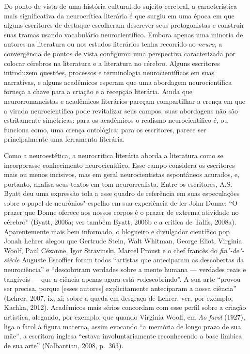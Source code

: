 Do ponto de vista de uma história cultural do sujeito cerebral, a
característica mais significativa da neurocrítica literária é que surgiu
em uma época em que alguns escritores de destaque escolheram descrever
seus protagonistas e construir suas tramas usando vocabulário
neurocientífico. Embora apenas uma minoria de autores na literatura ou
nos estudos literários tenha recorrido ao \emph{neuro}, a convergência
de pontos de vista configurou uma perspectiva caracterizada por colocar
cérebros na literatura e a literatura no cérebro. Alguns escritores
introduzem questões, processos e terminologia neurocientíficos em suas
narrativas, e alguns acadêmicos esperam que uma abordagem
neurocientífica forneça a chave para a criação e a recepção literária.
Ainda que neurorromancistas e acadêmicos literários pareçam compartilhar
a crença em que a virada neurocientífica pode revitalizar seus campos,
suas abordagens não são estritamente simétricas: para os acadêmicos o
realismo neurocientífico é, ou funciona como, uma crença ontológica;
para os escritores, parece ser principalmente uma ferramenta literária.

Como a neuroestética, a neurocrítica literária aborda a literatura como
se incorporasse conhecimento neurocientífico. Esse campo considera os
escritores mais ou menos incisivos, mas em geral neurocientistas
espontâneos acurados, e, portanto, analisa seus textos em tom
neurorrealista. Entre os escritores, A.S. Byatt deu uma expressão tola a
esse quadro de referência em suas especulações sobre o papel de
neurônios"-espelho em sua experiência de ler John Donne: ``O prazer que
Donne oferece aos nossos corpos é o prazer de extrema atividade no
cérebro'' (Byatt, 2006a; ver também Byatt, 2006b e a critica de Tallis,
2008a). Aparentemente mais bem informado, o blogueiro e divulgador
científico pop Jonah Lehrer alegou que Gertrude Stein, Walt Whitman,
George Eliot, Virginia Woolf, Paul Cézanne, Igor Stravinski, Marcel
Proust e o chef francês do \emph{fin"-de"-siècle} Auguste Escoffier foram
todos ``artistas que anteciparam as descobertas da neurociência'' e
``descobriram verdades sobre a mente humana --- verdades reais e
tangíveis --- que a ciência apenas agora está \emph{re}descobrindo''. A
sua arte ``provou ser precisa, porque {[}esses autores{]} explicitamente
anteciparam a nossa ciência'' (Lehrer, 2007, ix, xi; sobre a queda em
desgraça de Lehrer, ver, por exemplo, Kachka, 2012). Acadêmicos mais
sérios concordam com esse perfil sobre a criação artística, alegando,
por exemplo, que quando Virginia Woolf, em \emph{Ao farol} (1927), liga
o farol à figura materna, assim evocando ``a memória de longo prazo de
sua mãe'', a escritora inglesa ``estava involuntariamente reconhecendo a
base límbica de sua arte'' (Nalbantian, 2008, p.~363).

